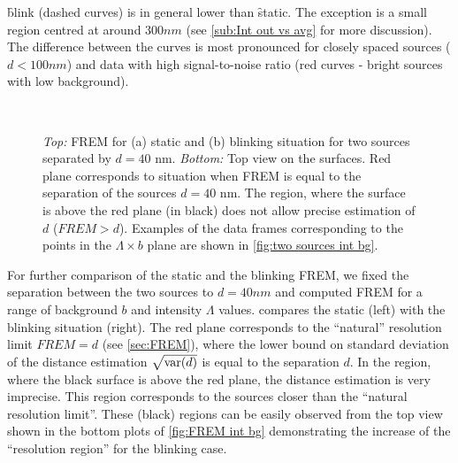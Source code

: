 \f{blink} (dashed curves) is in general lower than \f{static}. The exception is a small region centred at around $300\unit{nm}$ (see \autoref{sub:Int out vs avg} for more discussion). The difference between the curves is most pronounced for closely spaced sources ($d<100\unit{nm}$) and data with high signal-to-noise ratio (red curves - bright sources with low background). 

\begin{figure}[!htb]
	\centering
	\newcommand{\wf}{.48\textwidth}
	\\
	\caption{{\it Top:} FREM for (a) static and (b) blinking situation for two sources separated by $d=40$ nm. {\it Bottom:} Top view on the surfaces. Red plane corresponds to situation when FREM is equal to the separation of the sources $d=40$ nm. The region, where the surface is above the red plane (in black) does not allow precise estimation of $d$ ($\unit{FREM}>d$). Examples of the data frames corresponding to the points in the $\Lambda \times b$ plane are shown in  \autoref{fig:two sources int bg}.}
	\label{fig:FREM int bg}
\end{figure}

%
For further comparison of the static and the blinking FREM, we fixed the separation between the two sources to $d=40\unit{nm}$ and computed FREM for a range of background $b$ and intensity  $\Lambda$ values.  compares the static (left) with the blinking situation (right). The red plane corresponds to the ``natural'' resolution limit $\unit{FREM}=d$ (see \autoref{sec:FREM}), where the lower bound on standard deviation of the distance estimation $\sqrt{\mathrm{var}(d)}$ is equal to the separation $d$. In the region, where the black surface is above the red plane, the distance estimation is very imprecise. This region corresponds to the sources closer than the ``natural resolution limit''.  These (black) regions can be easily observed from the top view shown in the bottom plots of \autoref{fig:FREM int bg} demonstrating the increase of the ``resolution region'' for the blinking case.


